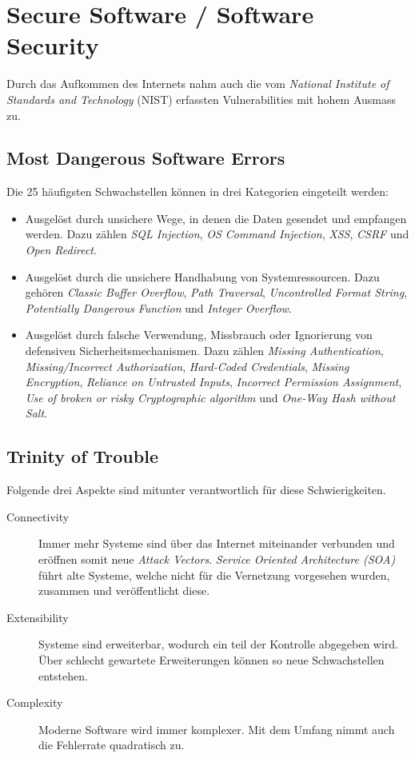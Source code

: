 \section{Secure Software / Software Security}

Durch das Aufkommen des Internets nahm auch die vom \textit{National Institute of Standards and Technology} (NIST) erfassten Vulnerabilities mit hohem Ausmass zu.

\subsection{Most Dangerous Software Errors}
Die 25 häufigsten Schwachstellen können in drei Kategorien eingeteilt werden:
\begin{itemize}
	\item Ausgelöst durch unsichere Wege, in denen die Daten gesendet und empfangen werden. Dazu zählen \textit{SQL Injection}, \textit{OS Command Injection}, \textit{XSS}, \textit{CSRF} und \textit{Open Redirect}.
	\item Ausgelöst durch die unsichere Handhabung von Systemressourcen. Dazu gehören \textit{Classic Buffer Overflow}, \textit{Path Traversal}, \textit{Uncontrolled Format String}, \textit{Potentially Dangerous Function} und \textit{Integer Overflow}.
	\item Ausgelöst durch falsche Verwendung, Missbrauch oder Ignorierung von defensiven Sicherheitsmechanismen. Dazu zählen \textit{Missing Authentication}, \textit{Missing/Incorrect Authorization}, \textit{Hard-Coded Credentials}, \textit{Missing Encryption}, \textit{Reliance on Untrusted Inputs}, \textit{Incorrect Permission Assignment}, \textit{Use of broken or risky Cryptographic algorithm} und \textit{One-Way Hash without Salt}.
\end{itemize}

\subsection{Trinity of Trouble}
Folgende drei Aspekte sind mitunter verantwortlich für diese Schwierigkeiten.
\begin{description}
	\item[Connectivity] Immer mehr Systeme sind über das Internet miteinander verbunden und eröffnen somit neue \textit{Attack Vectors}. \textit{Service Oriented Architecture (SOA)} führt alte Systeme, welche nicht für die Vernetzung vorgesehen wurden, zusammen und veröffentlicht diese.
	\item[Extensibility] Systeme sind erweiterbar, wodurch ein teil der Kontrolle abgegeben wird. Über schlecht gewartete Erweiterungen können so neue Schwachstellen entstehen.
	\item[Complexity] Moderne Software wird immer komplexer. Mit dem Umfang nimmt auch die Fehlerrate quadratisch zu.
\end{description}

